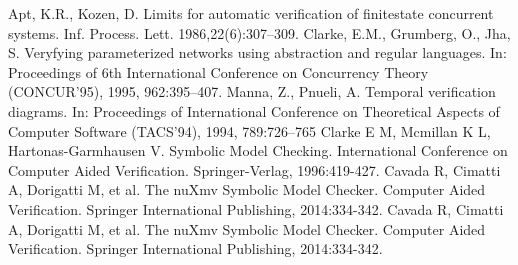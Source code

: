 \begin{thebibliography}{0}
   Apt, K.R., Kozen, D. Limits for automatic verification of finitestate concurrent systems. Inf. Process. Lett. 1986,22(6):307–309.
   Clarke, E.M., Grumberg, O., Jha, S. Veryfying parameterized networks using abstraction and regular languages. In: Proceedings of 6th International Conference on Concurrency Theory (CONCUR’95), 1995, 962:395–407.
   Manna, Z., Pnueli, A. Temporal verification diagrams. In: Proceedings of International Conference on Theoretical Aspects of Computer Software (TACS’94), 1994, 789:726–765
   Clarke E M, Mcmillan K L, Hartonas-Garmhausen V. Symbolic Model Checking. International Conference on Computer Aided Verification. Springer-Verlag, 1996:419-427.
   Cavada R, Cimatti A, Dorigatti M, et al. The nuXmv Symbolic Model Checker. Computer Aided Verification. Springer International Publishing, 2014:334-342.
   Cavada R, Cimatti A, Dorigatti M, et al. The nuXmv Symbolic Model Checker. Computer Aided Verification. Springer International Publishing, 2014:334-342.

		
\end{thebibliography}
